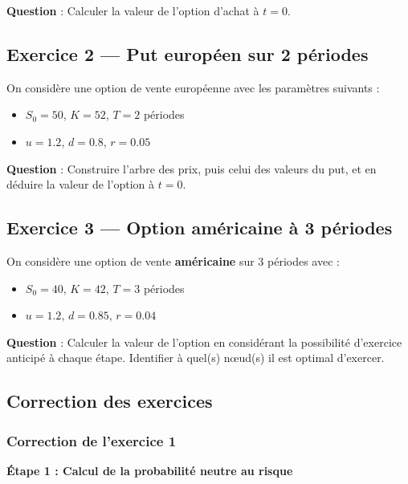 \documentclass[12pt,a4paper]{article}
\begin{document}
\textbf{Question} : Calculer la valeur de l’option d’achat à $t = 0$.

\vspace{0.3cm}

\subsection*{Exercice 2 — Put européen sur 2 périodes}
On considère une option de vente européenne avec les paramètres suivants :

\begin{itemize}
    \item $S_0 = 50$, $K = 52$, $T = 2$ périodes
    \item $u = 1.2$, $d = 0.8$, $r = 0.05$
\end{itemize}

\textbf{Question} : Construire l’arbre des prix, puis celui des valeurs du put, et en déduire la valeur de l’option à $t = 0$.

\vspace{0.3cm}

\subsection*{Exercice 3 — Option américaine à 3 périodes}
On considère une option de vente \textbf{américaine} sur 3 périodes avec :

\begin{itemize}
    \item $S_0 = 40$, $K = 42$, $T = 3$ périodes
    \item $u = 1.2$, $d = 0.85$, $r = 0.04$
\end{itemize}

\textbf{Question} : Calculer la valeur de l’option en considérant la possibilité d’exercice anticipé à chaque étape. Identifier à quel(s) nœud(s) il est optimal d’exercer.

\vspace{1cm}

\subsection*{Correction des exercices}

\subsubsection*{Correction de l’exercice 1}

\textbf{Étape 1 : Calcul de la probabilité neutre au risque}
\end{document}
